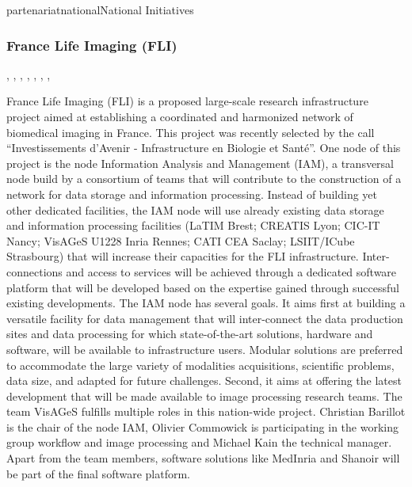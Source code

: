 \documentclass{ra2018}
\begin{document}
\begin{module}{partenariat}{national}{National Initiatives}
        \subsubsection{France Life Imaging (FLI)}
        \begin{participants}    	
          , 	
          ,
          ,
          ,
          ,
          ,
          ,
        \end{participants}  
        
        France Life Imaging (FLI) is a proposed large-scale research infrastructure
        project aimed at establishing a coordinated and harmonized network of
        biomedical imaging in France. This project was recently selected by the call
        ``Investissements d’Avenir - Infrastructure en Biologie et Santé''. One node of
        this project is the node Information Analysis and Management (IAM), a
        transversal node build by a consortium of teams that will contribute to the
        construction of a network for data storage and information processing. Instead
        of building yet other dedicated facilities, the IAM node will use already
        existing data storage and information processing facilities (LaTIM Brest;
        CREATIS Lyon; CIC-IT Nancy; VisAGeS U1228 Inria Rennes; CATI CEA Saclay;
        LSIIT/ICube Strasbourg) that will increase their capacities for the FLI
        infrastructure. Inter-connections and access to services will be achieved
        through a dedicated software platform that will be developed based on the
        expertise gained through successful existing developments.  The IAM node has
        several goals. It aims first at building a versatile facility for data
        management that will inter-connect the data production sites and data
        processing for which state-of-the-art solutions, hardware and software, will be
        available to infrastructure users. Modular solutions are preferred to
        accommodate the large variety of modalities acquisitions, scientific problems,
        data size, and adapted for future challenges. Second, it aims at offering the
        latest development that will be made available to image processing research
        teams.  The team VisAGeS fulfills multiple roles in this nation-wide project.
        Christian Barillot is the chair of the node IAM, Olivier Commowick is
        participating in the working group workflow and image processing and Michael
        Kain the technical manager. Apart from the team members, software solutions
        like MedInria and Shanoir will be part of the final software platform.
        

\end{module}
\end{document}
